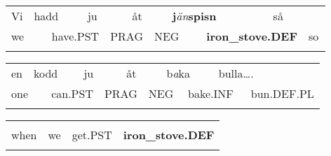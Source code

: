 \begin{tabular}{llllllllllll}
\lsptoprule
Vi & \multicolumn{2}{l}{hadd

} & \multicolumn{2}{l}{ju

} & \multicolumn{2}{l}{åt

} & \multicolumn{2}{l}{\textbf{j}\textit{än}\textbf{spisn}

} & \multicolumn{2}{l}{så

} & \\
\multicolumn{2}{l}{we

} & \multicolumn{2}{l}{have.PST

} & \multicolumn{2}{l}{PRAG

} & \multicolumn{2}{l}{NEG

} & \multicolumn{2}{l}{{\bfseries iron\_stove.DEF}

} & \multicolumn{2}{l}{so

}\\
\lspbottomrule
\end{tabular}

\begin{tabular}{llllllllllll}
\lsptoprule
en & \multicolumn{2}{l}{kodd

} & \multicolumn{2}{l}{ju

} & \multicolumn{2}{l}{åt

} & \multicolumn{2}{l}{b\textit{a}ka

} & \multicolumn{2}{l}{bulla….

} & \\
\multicolumn{2}{l}{one

} & \multicolumn{2}{l}{can.PST

} & \multicolumn{2}{l}{PRAG

} & \multicolumn{2}{l}{NEG

} & \multicolumn{2}{l}{bake.INF

} & \multicolumn{2}{l}{bun.DEF.PL

}\\
\lspbottomrule
\end{tabular}

\begin{tabular}{llll}
\lsptoprule
\multicolumn{4}{l}{Da

}\\
when & we & get.PST & {\bfseries iron\_stove.DEF}\\
\lspbottomrule
\end{tabular}

